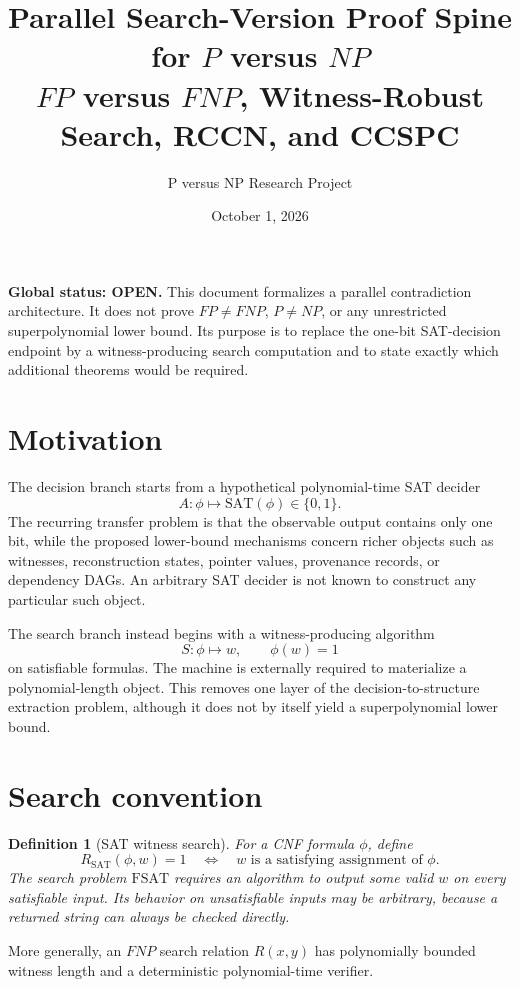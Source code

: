 \documentclass[11pt]{article}
\title{Parallel Search-Version Proof Spine for \(P\) versus \(NP\)\\
\large \(FP\) versus \(FNP\), Witness-Robust Search, RCCN, and CCSPC}
\author{P versus NP Research Project}
\date{October 1, 2026}
\newtheorem{definition}[theorem]{Definition}
\newcommand{\SAT}{\mathrm{SAT}}
\newcommand{\FSAT}{\mathrm{FSAT}}
\begin{document}
\maketitle

\begin{openbox}
\textbf{Global status: OPEN.}
This document formalizes a parallel contradiction architecture. It does not prove
\(FP\neq FNP\), \(P\neq NP\), or any unrestricted superpolynomial lower bound.
Its purpose is to replace the one-bit SAT-decision endpoint by a witness-producing
search computation and to state exactly which additional theorems would be required.
\end{openbox}

\section{Motivation}

The decision branch starts from a hypothetical polynomial-time SAT decider
\[
A:\phi\longmapsto \SAT(\phi)\in\{0,1\}.
\]
The recurring transfer problem is that the observable output contains only one bit, while
the proposed lower-bound mechanisms concern richer objects such as witnesses, reconstruction
states, pointer values, provenance records, or dependency DAGs. An arbitrary SAT decider is
not known to construct any particular such object.

The search branch instead begins with a witness-producing algorithm
\[
S:\phi\longmapsto w,
\qquad
\phi(w)=1
\]
on satisfiable formulas. The machine is externally required to materialize a polynomial-length
object. This removes one layer of the decision-to-structure extraction problem, although it does
not by itself yield a superpolynomial lower bound.

\section{Search convention}

\begin{definition}[SAT witness search]
For a CNF formula \(\phi\), define
\[
R_{\SAT}(\phi,w)=1
\quad\Longleftrightarrow\quad
w\text{ is a satisfying assignment of }\phi.
\]
The search problem \(\FSAT\) requires an algorithm to output some valid \(w\) on every satisfiable
input. Its behavior on unsatisfiable inputs may be arbitrary, because a returned string can always
be checked directly.
\end{definition}

More generally, an \(FNP\) search relation \(R(x,y)\) has polynomially bounded witness length and
a deterministic polynomial-time verifier.
\end{document}
